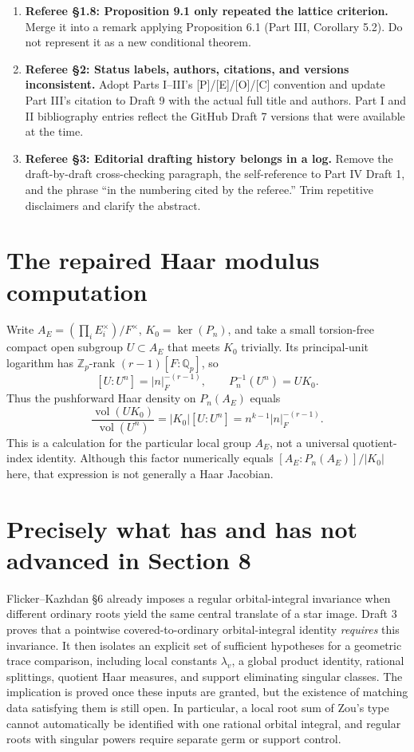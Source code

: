 \documentclass[11pt]{article}
\begin{document}
\begin{enumerate}[leftmargin=*,itemsep=0.55em]
\item \textbf{Referee \S1.8: Proposition 9.1 only repeated the lattice criterion.} Merge it into a remark applying Proposition 6.1 (Part III, Corollary 5.2).  Do not represent it as a new conditional theorem.
\item \textbf{Referee \S2: Status labels, authors, citations, and versions inconsistent.} Adopt Parts I--III's [P]/[E]/[O]/[C] convention and update Part III's citation to Draft 9 with the actual full title and authors. Part I and II bibliography entries reflect the GitHub Draft 7 versions that were available at the time.
\item \textbf{Referee \S3: Editorial drafting history belongs in a log.} Remove the draft-by-draft cross-checking paragraph, the self-reference to Part IV Draft 1, and the phrase ``in the numbering cited by the referee.'' Trim repetitive disclaimers and clarify the abstract.
\end{enumerate}

\section*{The repaired Haar modulus computation}
Write $A_E=(\prod_i E_i^\times)/F^\times$, $K_0=\ker(P_n)$,
and take a small torsion-free compact open subgroup $U\subset A_E$
that meets $K_0$ trivially.  Its principal-unit logarithm has
$\mathbb Z_p$-rank $(r-1)[F:\mathbb Q_p]$, so
\[
[U:U^n]=|n|_F^{-(r-1)},\qquad
P_n^{-1}(U^n)=UK_0.
\]
Thus the pushforward Haar density on $P_n(A_E)$ equals
\[
\frac{\operatorname{vol}(UK_0)}{\operatorname{vol}(U^n)}
=|K_0|[U:U^n]=n^{k-1}|n|_F^{-(r-1)}.
\]
This is a calculation for the particular local group $A_E$,
not a universal quotient-index identity.  Although this factor
numerically equals $[A_E:P_n(A_E)]/|K_0|$ here, that expression
is not generally a Haar Jacobian.

\section*{Precisely what has and has not advanced in Section 8}
Flicker--Kazhdan \S6 already imposes a regular orbital-integral
invariance when different ordinary roots yield the same central
translate of a star image.  Draft 3 proves that a pointwise
covered-to-ordinary orbital-integral identity \emph{requires}
this invariance.  It then isolates an explicit set of sufficient
hypotheses for a geometric trace comparison, including local
constants $\lambda_v$, a global product identity, rational
splittings, quotient Haar measures, and support eliminating
singular classes.  The implication is proved once these inputs
are granted, but the existence of matching data satisfying them
is still open.  In particular, a local root sum of Zou's type
cannot automatically be identified with one rational orbital
integral, and regular roots with singular powers require separate
germ or support control.
\end{document}
